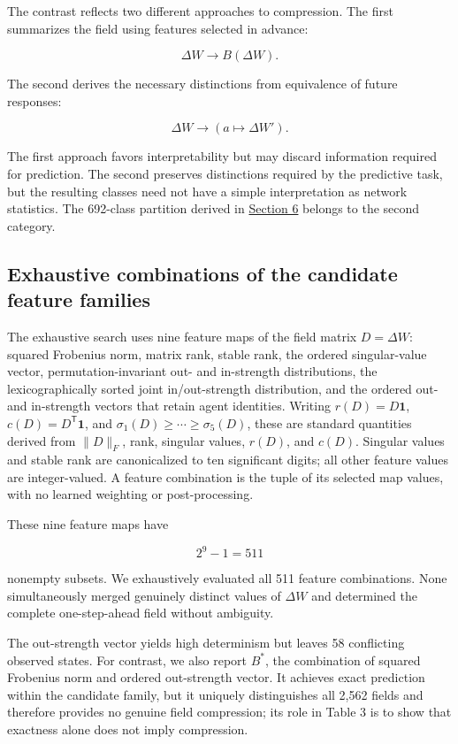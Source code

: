 \documentclass[
  11pt,
]{article}
\begin{document}
The contrast reflects two different approaches to compression. The first
summarizes the field using features selected in advance:

\[{\Delta W\longrightarrow B(\Delta W).}\]

The second derives the necessary distinctions from equivalence of future
responses:

\[{\Delta W\longrightarrow\left(a\longmapsto\Delta W'\right).}\]

The first approach favors interpretability but may discard information
required for prediction. The second preserves distinctions required by
the predictive task, but the resulting classes need not have a simple
interpretation as network statistics. The 692-class partition derived in
\hyperref[exact-minimum-predictive-partition]{Section 6} belongs to the second category.

\hypertarget{exhaustive-combinations-of-the-candidate-feature-families}{%
\subsection{Exhaustive combinations of the candidate feature
families}\label{exhaustive-combinations-of-the-candidate-feature-families}}

The exhaustive search uses nine feature maps of the field matrix
\({D=\Delta W}\): squared Frobenius norm, matrix rank, stable rank,
the ordered singular-value vector, permutation-invariant out- and
in-strength distributions, the lexicographically sorted joint
in/out-strength distribution, and the ordered out- and in-strength
vectors that retain agent identities. Writing
\({r(D)=D\mathbf 1}\), \({c(D)=D^{\mathsf T}\mathbf 1}\), and
\({\sigma_1(D)\ge\cdots\ge\sigma_5(D)}\), these are standard
quantities derived from \({\lVert D\rVert_F}\), rank, singular values,
\({r(D)}\), and \({c(D)}\). Singular values and stable rank are
canonicalized to ten significant digits; all other feature values are
integer-valued. A feature combination is the tuple of its selected map
values, with no learned weighting or post-processing.

These nine feature maps have

\[{2^9-1=511}\]

nonempty subsets. We exhaustively evaluated all 511 feature
combinations. None simultaneously merged genuinely distinct values of
\({\Delta W}\) and determined the complete one-step-ahead field without
ambiguity.

The out-strength vector yields high determinism but leaves 58
conflicting observed states. For contrast, we also report
\({B^\ast}\), the combination of squared Frobenius norm and ordered
out-strength vector. It achieves exact prediction within the candidate
family, but it uniquely distinguishes all 2,562 fields and therefore
provides no genuine field compression; its role in Table 3 is to show
that exactness alone does not imply compression.
\end{document}
